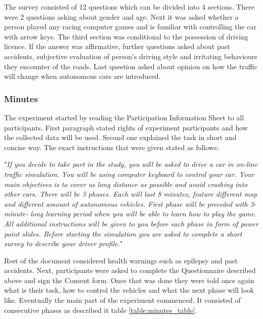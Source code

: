 \documentclass[11pt,english,twoside]{article}
\begin{document}
The survey consisted of 12 questions which can be divided into 4 sections. There were 2 questions asking about gender and age. Next it was asked whether a person played any racing computer games and is familiar with controlling the car with arrow keys. The third section was conditional to the possession of driving licence. If the answer was affirmative, further questions asked about past accidents, subjective evaluation of person's driving style and irritating behaviours they encounter of the roads.
Last question asked about opinion on how the traffic will change when autonomous cars are introduced. 




\subsubsection{Minutes}

The experiment started by reading the Participation Information Sheet to all participants. First paragraph stated rights of experiment participants and how the collected data will be used. Second one explained the task in short and concise way. The exact instructions that were given stated as follows:

"\textit{If you decide to take part in the study, you will be asked to drive a car in on-line traffic simulation. You will be using computer keyboard to control your car. Your main objectives is to cover as long distance as possible and avoid crashing into other cars. There will be 3 phases. Each will last 8 minutes, feature different map and different amount of autonomous vehicles. First phase will be preceded with 3-minute- long learning period when you will be able to learn how to play the game. All additional instructions will be given to you before each phase in form of power point slides. Before starting the simulation you are asked to complete a short survey to describe your driver profile.}"

Rest of the document considered health warnings such as epilepsy and past accidents. Next, participants were asked to complete the Questionnaire described above and sign the Consent form. Once that was done they were told once again what is their task, how to control the vehicles and what the next phase will look like. Eventually the main part of the experiment commenced. It consisted of consecutive phases as described it table \ref{table:minutes_table}.
\end{document}
